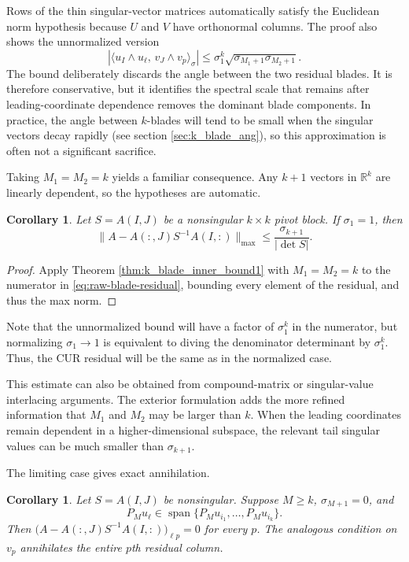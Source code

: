 \documentclass[11pt, preprint]{article}
\newtheorem{corollary}[theorem]{Corollary}
\newcommand{\R}{\mathbb{R}}
\newcommand{\inner}[1]{\langle #1\rangle}
\newcommand{\Span}{\operatorname{span}}
\begin{document}
Rows of the thin singular-vector matrices automatically satisfy the Euclidean norm hypothesis because $U$ and $V$ have orthonormal columns. The proof also shows the unnormalized version
\[
\left|
\inner{u_I\wedge u_\ell,\,v_J\wedge v_p}_\sigma
\right|
\leq
\sigma_1^k\sqrt{\sigma_{M_1+1}\sigma_{M_2+1}}.
\]
The bound deliberately discards the angle between the two residual blades. It is therefore conservative, but it identifies the spectral scale that remains after leading-coordinate dependence removes the dominant blade components. In practice, the angle between $k$-blades will tend to be small when the singular vectors decay rapidly (see section \ref{sec:k_blade_ang}), so this approximation is often not a significant sacrifice. 

Taking $M_1=M_2=k$ yields a familiar consequence. Any $k+1$ vectors in $\R^k$ are linearly dependent, so the hypotheses are automatic.

\begin{corollary} \label{corr:sig_k_1_bound}
Let $S=A(I,J)$ be a nonsingular $k\times k$ pivot block. If $\sigma_1=1$, then
\[
\big\|A-A(:,J)S^{-1}A(I,:)\big\|_{\max}
\leq
\frac{\sigma_{k+1}}{|\det S|}.
\]
\end{corollary}

\begin{proof}
Apply Theorem \ref{thm:k_blade_inner_bound1} with $M_1=M_2=k$ to the numerator in \eqref{eq:raw-blade-residual}, bounding every element of the residual, and thus the max norm.
\end{proof}

Note that the unnormalized bound will have a factor of $\sigma_1^k$ in the numerator, but normalizing $\sigma_1\to 1$ is equivalent to diving the denominator determinant by $\sigma_1^k$. Thus, the CUR residual will be the same as in the normalized case. 

This estimate can also be obtained from compound-matrix or singular-value interlacing arguments. The exterior formulation adds the more refined information that $M_1$ and $M_2$ may be larger than $k$. When the leading coordinates remain dependent in a higher-dimensional subspace, the relevant tail singular values can be much smaller than $\sigma_{k+1}$.

The limiting case gives exact annihilation.

\begin{corollary} \label{corr:zero_M_sing_val}
Let $S=A(I,J)$ be nonsingular. Suppose $M\geq k$, $\sigma_{M+1}=0$, and
\[
P_Mu_\ell\in
\Span\{P_Mu_{i_1},\ldots,P_Mu_{i_k}\}.
\]
Then \(
\big(A-A(:,J)S^{-1}A(I,:)\big)_{\ell p}=0\) for every \(p\). 
The analogous condition on $v_p$ annihilates the entire $p$th residual column.
\end{corollary}
\end{document}
